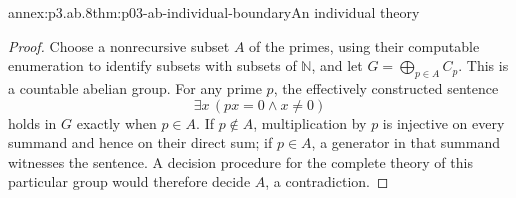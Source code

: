 \begin{annexitem}{annex:p3.ab.8}{thm:p03-ab-individual-boundary}{An individual theory}
\begin{proof}
Choose a nonrecursive subset \(A\) of the primes, using their computable
enumeration to identify subsets with subsets of \(\mathbb N\), and let
\(G=\bigoplus_{p\in A}C_p\). This is a countable abelian group. For any
prime \(p\), the effectively constructed sentence
\[
 \exists x\,(px=0\land x\ne0)
\]
holds in \(G\) exactly when \(p\in A\). If \(p\notin A\), multiplication
by \(p\) is injective on every summand and hence on their direct sum;
if \(p\in A\), a generator in that summand witnesses the sentence.
A decision procedure for the complete theory of this particular group
would therefore decide \(A\), a contradiction.
\end{proof}
\end{annexitem}
